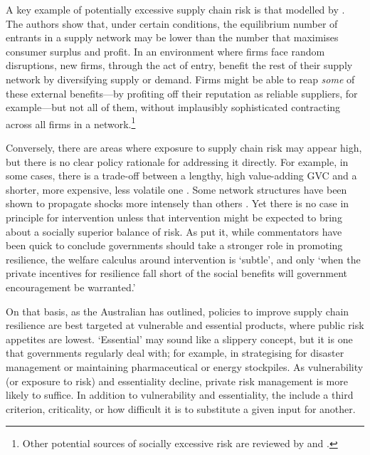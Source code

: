 \documentclass{article}
\begin{document}
A key example of potentially excessive supply chain risk is that modelled by \textcite{bimpikis_supply_2019}. The authors show that, under certain conditions, the equilibrium number of entrants in a supply network may be lower than the number that maximises consumer surplus and profit. In an environment where firms face random disruptions, new firms, through the act of entry, benefit the rest of their supply network by diversifying supply or demand. Firms might be able to reap \textit{some} of these external benefits---by profiting off their reputation as reliable suppliers, for example---but not all of them, without implausibly sophisticated contracting across all firms in a network.\footnote{Other potential sources of socially excessive risk are reviewed by \textcite{elliott_networks_2022} and \textcite{hardwick_policy_2024}.} 

Conversely, there are areas where exposure to supply chain risk may appear high, but there is no clear policy rationale for addressing it directly. For example, in some cases, there is a trade-off between a lengthy, high value-adding GVC and a shorter, more expensive, less volatile one \parencite{levine_production_2012}. Some network structures have been shown to propagate shocks more intensely than others \parencite{todo_propagation_2019}. Yet there is no case in principle for intervention unless that intervention might be expected to bring about a socially superior balance of risk. As \textcite[3493]{grossman_supply_2023} put it, while commentators have been quick to conclude governments should take a stronger role in promoting resilience, the welfare calculus around intervention is `subtle', and only `when the private incentives for resilience fall short of the social benefits will government encouragement be warranted.'

On that basis, as the Australian \textcite{productivity_commission_vulnerable_2021} has outlined, policies to improve supply chain resilience are best targeted at vulnerable and essential products, where public risk appetites are lowest. `Essential' may sound like a slippery concept, but it is one that governments regularly deal with; for example, in strategising for disaster management or maintaining pharmaceutical or energy stockpiles. As vulnerability (or exposure to risk) and essentiality decline, private risk management is more likely to suffice. In addition to vulnerability and essentiality, the \textcite{productivity_commission_vulnerable_2021} include a third criterion, criticality, or how difficult it is to substitute a given input for another.
\end{document}
